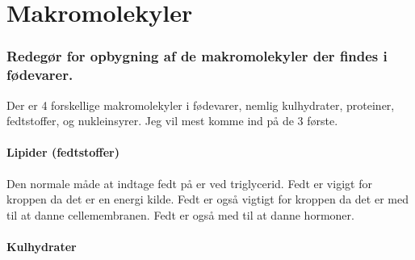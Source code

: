 \newpage
\part{Makromolekyler}
    \section{Redegør for opbygning af de makromolekyler der findes i fødevarer.}
        Der er 4 forskellige makromolekyler i fødevarer, nemlig kulhydrater, proteiner, fedtstoffer, og nukleinsyrer. Jeg vil mest komme ind på de 3 første. 
        \subsection{Lipider (fedtstoffer)}
           Den normale måde at indtage fedt på er ved triglycerid. Fedt er vigigt for kroppen da det er en energi kilde. Fedt er også vigtigt for kroppen da det er med til at danne cellemembranen. Fedt er også med til at danne hormoner. 
        \subsection{Kulhydrater}

